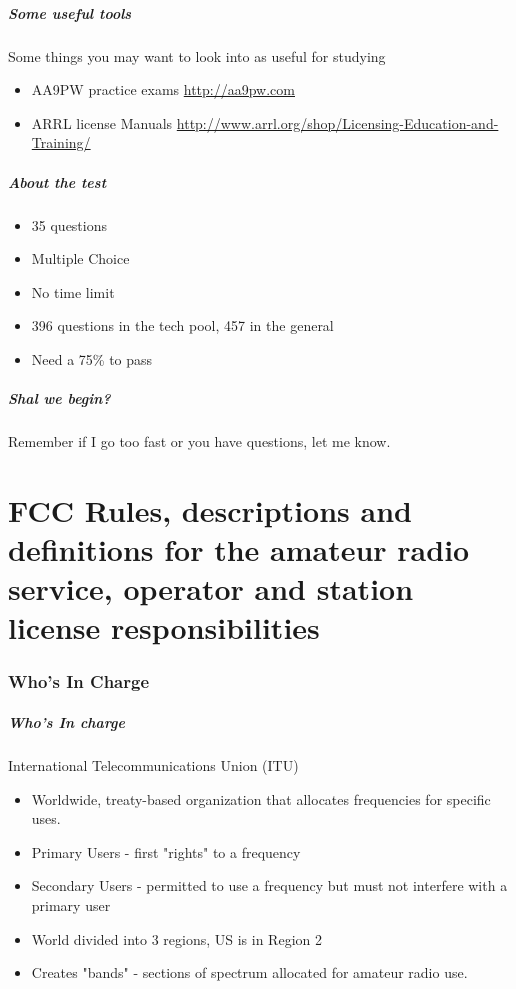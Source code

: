\documentclass[10pt]{beamer}
\begin{document}
\begin{frame}
\frametitle{Some useful tools}
Some things you may want to look into as useful for studying
\begin{itemize}
\item AA9PW practice exams \url{http://aa9pw.com}
\item ARRL license Manuals \url{http://www.arrl.org/shop/Licensing-Education-and-Training/}
\end{itemize}
\end{frame}

\begin{frame}
\frametitle{About the test}
\begin{itemize}
\item 35 questions \pause
\item Multiple Choice \pause
\item No time limit \pause
\item 396 questions in the tech pool, 457 in the general \pause
\item Need a 75\% to pass
\end{itemize}
\end{frame}

\begin{frame}
\frametitle{Shal we begin?}
Remember if I go too fast or you have questions, let me know.
\end{frame}

\part{FCC Rules, descriptions and definitions for the amateur radio service, operator and station license responsibilities}
\section{Who's In Charge}
\begin{frame}
\frametitle{Who's In charge}
International Telecommunications Union (ITU)
\begin{itemize}
\item Worldwide, treaty-based organization that allocates frequencies for specific uses.
\item Primary Users - first "rights" to a frequency
\item Secondary Users - permitted to use a frequency but must not interfere with a primary user
\item World divided into 3 regions, US is in Region 2
\item Creates "bands" - sections of spectrum allocated for amateur radio use.
\end{itemize}
\end{frame}
\end{document}
